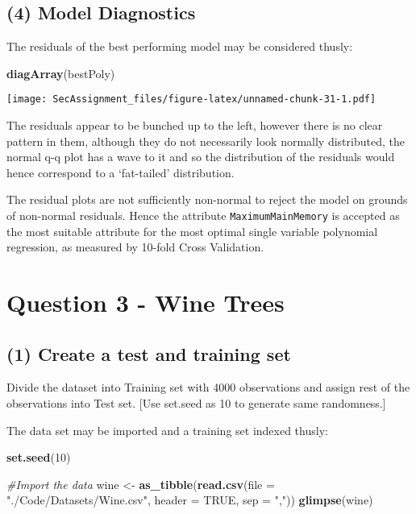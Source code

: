 \documentclass[12pt]{article}
\newenvironment{Shaded}{\begin{snugshade}}{\end{snugshade}}
\newcommand{\CommentTok}[1]{\textcolor[rgb]{0.56,0.35,0.01}{\textit{#1}}}
\newcommand{\DataTypeTok}[1]{\textcolor[rgb]{0.13,0.29,0.53}{#1}}
\newcommand{\DecValTok}[1]{\textcolor[rgb]{0.00,0.00,0.81}{#1}}
\newcommand{\KeywordTok}[1]{\textcolor[rgb]{0.13,0.29,0.53}{\textbf{#1}}}
\newcommand{\NormalTok}[1]{#1}
\newcommand{\OtherTok}[1]{\textcolor[rgb]{0.56,0.35,0.01}{#1}}
\newcommand{\StringTok}[1]{\textcolor[rgb]{0.31,0.60,0.02}{#1}}
\begin{document}
\hypertarget{model-diagnostics}{%
\subsection{(4) Model Diagnostics}\label{model-diagnostics}}

The residuals of the best performing model may be considered thusly:

\begin{Shaded}
\begin{Highlighting}[]
\KeywordTok{diagArray}\NormalTok{(bestPoly)}
\end{Highlighting}
\end{Shaded}

\texttt{[image: SecAssignment\_files/figure-latex/unnamed-chunk-31-1.pdf]}

The residuals appear to be bunched up to the left, however there is no
clear pattern in them, although they do not necessarily look normally
distributed, the normal q-q plot has a wave to it and so the
distribution of the residuals would hence correspond to a `fat-tailed'
distribution.

The residual plots are not sufficiently non-normal to reject the model
on grounds of non-normal residuals. Hence the attribute
\texttt{MaximumMainMemory} is accepted as the most suitable attribute
for the most optimal single variable polynomial regression, as measured
by 10-fold Cross Validation.

\hypertarget{question-3---wine-trees}{%
\section{Question 3 - Wine Trees}\label{question-3---wine-trees}}

\hypertarget{create-a-test-and-training-set}{%
\subsection{(1) Create a test and training
set}\label{create-a-test-and-training-set}}

Divide the dataset into Training set with 4000 observations and assign
rest of the observations into Test set. {[}Use set.seed as 10 to
generate same randomness.{]}

The data set may be imported and a training set indexed thusly:

\begin{Shaded}
\begin{Highlighting}[]
\KeywordTok{set.seed}\NormalTok{(}\DecValTok{10}\NormalTok{)}

\CommentTok{#Import the data}
\NormalTok{wine <-}\StringTok{ }\KeywordTok{as_tibble}\NormalTok{(}\KeywordTok{read.csv}\NormalTok{(}\DataTypeTok{file =} \StringTok{"./Code/Datasets/Wine.csv"}\NormalTok{, }\DataTypeTok{header =} \OtherTok{TRUE}\NormalTok{, }\DataTypeTok{sep =} \StringTok{","}\NormalTok{))}
\KeywordTok{glimpse}\NormalTok{(wine)}
\end{Highlighting}
\end{Shaded}
\end{document}

